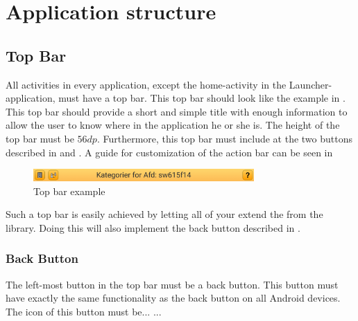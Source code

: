 
\chapter{Application structure}

\section{Top Bar}
All activities in every application, except the home-activity in the Launcher-application,  must have a top bar. This top bar should look like the example in . This top bar should provide a short and simple title with enough information to allow the user to know where in the application he or she is. The height of the top bar must be $56dp$. Furthermore, this top bar must include at the two buttons described in  and . A guide for customization of the action bar can be seen in 


\begin{figure}[!htbp]
        \centering
        \includegraphics[width=0.75\textwidth]{pictures/application_structure/topbar}
        \caption{Top bar example}
        \label{fig:top_bar_example}
\end{figure}

\begin{note}
    Such a top bar is easily achieved by letting all of your  extend the  from the \gc library. Doing this will also implement the back button described in .
\end{note}

\subsection{Back Button}
\label{sec:back_button}
The left-most button in the top bar must be a back button. This button must have exactly the same functionality as the back button on all Android devices. The icon of this button must be... ...

